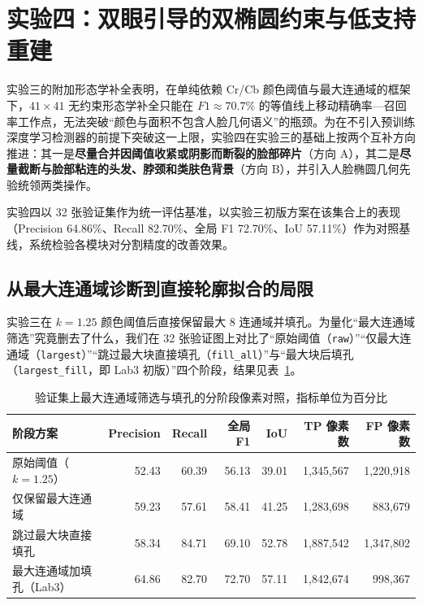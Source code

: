 \section{实验四：双眼引导的双椭圆约束与低支持重建}\label{sec:lab4}

实验三的附加形态学补全表明，在单纯依赖 Cr/Cb 颜色阈值与最大连通域的框架下，$41\times41$ 无约束形态学补全只能在 $F1\approx70.7\%$ 的等值线上移动精确率—召回率工作点，无法突破“颜色与面积不包含人脸几何语义”的瓶颈。为在不引入预训练深度学习检测器的前提下突破这一上限，实验四在实验三的基础上按两个互补方向推进：其一是\textbf{尽量合并因阈值收紧或阴影而断裂的脸部碎片}（方向 A），其二是\textbf{尽量截断与脸部粘连的头发、脖颈和类肤色背景}（方向 B），并引入人脸椭圆几何先验统领两类操作。

实验四以 32 张验证集作为统一评估基准，以实验三初版方案在该集合上的表现（Precision 64.86\%、Recall 82.70\%、全局 F1 72.70\%、IoU 57.11\%）作为对照基线，系统检验各模块对分割精度的改善效果。

\subsection{从最大连通域诊断到直接轮廓拟合的局限}

实验三在 $k=1.25$ 颜色阈值后直接保留最大 8 连通域并填孔。为量化“最大连通域筛选”究竟删去了什么，我们在 32 张验证图上对比了“原始阈值（\texttt{raw}）”“仅最大连通域（\texttt{largest}）”“跳过最大块直接填孔（\texttt{fill\_all}）”与“最大块后填孔（\texttt{largest\_fill}，即 Lab3 初版）”四个阶段，结果见表~\ref{tab:lab4_cc}。

\begin{table}[H]
\centering\small
\caption{验证集上最大连通域筛选与填孔的分阶段像素对照，指标单位为百分比}\label{tab:lab4_cc}
\begin{tabular}{lrrrrrr}
\toprule
阶段方案 & Precision & Recall & 全局 F1 & IoU & TP 像素数 & FP 像素数 \\
\midrule
原始阈值（$k=1.25$） & 52.43 & 60.39 & 56.13 & 39.01 & 1,345,567 & 1,220,918 \\
仅保留最大连通域 & 59.23 & 57.61 & 58.41 & 41.25 & 1,283,698 & 883,679 \\
跳过最大块直接填孔 & 58.34 & 84.71 & 69.10 & 52.78 & 1,887,542 & 1,347,802 \\
最大连通域加填孔（Lab3） & 64.86 & 82.70 & 72.70 & 57.11 & 1,842,674 & 998,367 \\
\bottomrule
\end{tabular}
\end{table}

